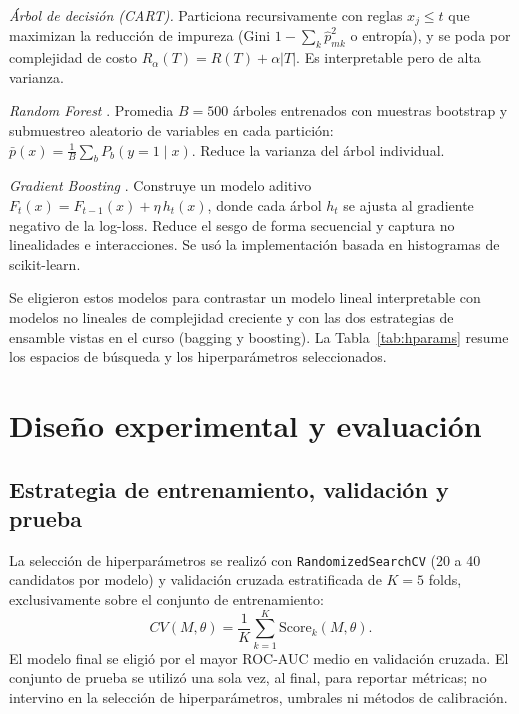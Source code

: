 \documentclass[conference]{IEEEtran}
\begin{document}
\textit{Árbol de decisión (CART).} Particiona recursivamente con reglas $x_j\le t$ que maximizan la reducción de impureza (Gini $1-\sum_k\hat p_{mk}^2$ o entropía), y se poda por complejidad de costo $R_\alpha(T)=R(T)+\alpha\lvert T\rvert$. Es interpretable pero de alta varianza.

\textit{Random Forest} \cite{breiman2001}. Promedia $B=500$ árboles entrenados con muestras bootstrap y submuestreo aleatorio de variables en cada partición: $\bar p(x)=\frac1B\sum_b P_b(y=1\mid x)$. Reduce la varianza del árbol individual.

\textit{Gradient Boosting} \cite{friedman2001}. Construye un modelo aditivo $F_t(x)=F_{t-1}(x)+\eta\,h_t(x)$, donde cada árbol $h_t$ se ajusta al gradiente negativo de la log-loss. Reduce el sesgo de forma secuencial y captura no linealidades e interacciones. Se usó la implementación basada en histogramas de scikit-learn.

Se eligieron estos modelos para contrastar un modelo lineal interpretable con modelos no lineales de complejidad creciente y con las dos estrategias de ensamble vistas en el curso (bagging y boosting). La Tabla~\ref{tab:hparams} resume los espacios de búsqueda y los hiperparámetros seleccionados.



\section{Diseño experimental y evaluación}
\label{sec:design}

\subsection{Estrategia de entrenamiento, validación y prueba}
La selección de hiperparámetros se realizó con \texttt{RandomizedSearchCV} (20 a 40 candidatos por modelo) y validación cruzada estratificada de $K=5$ folds, exclusivamente sobre el conjunto de entrenamiento:
\begin{equation}
CV(M,\theta)=\frac1K\sum_{k=1}^{K}\mathrm{Score}_k(M,\theta).
\end{equation}
El modelo final se eligió por el mayor ROC-AUC medio en validación cruzada. El conjunto de prueba se utilizó una sola vez, al final, para reportar métricas; no intervino en la selección de hiperparámetros, umbrales ni métodos de calibración.
\end{document}

